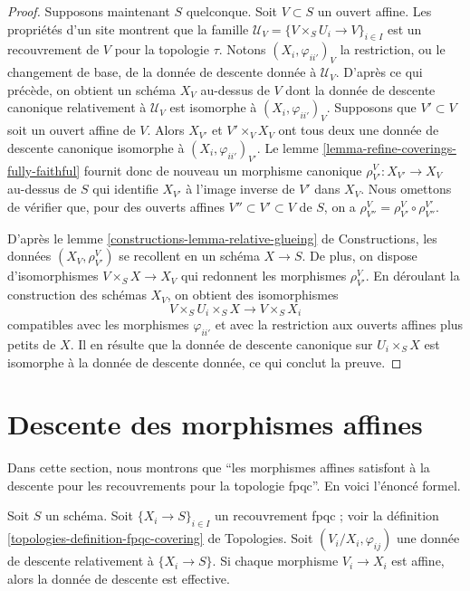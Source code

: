 \begin{proof}
\medskip\noindent
Supposons maintenant $S$ quelconque. Soit $V \subset S$ un ouvert affine.
Les propriétés d'un site montrent que la famille
$\mathcal{U}_V = \{V \times_S U_i \to V\}_{i \in I}$ est un recouvrement de
$V$ pour la topologie $\tau$. Notons $(X_i, \varphi_{ii'})_V$ la restriction, ou le
changement de base, de la donnée de descente donnée à $\mathcal{U}_V$. D'après
ce qui précède, on obtient un schéma $X_V$ au-dessus de $V$ dont la donnée de
descente canonique relativement à $\mathcal{U}_V$ est isomorphe à
$(X_i, \varphi_{ii'})_V$. Supposons que $V' \subset V$ soit un ouvert affine
de $V$. Alors $X_{V'}$ et $V' \times_V X_V$ ont tous deux une donnée de
descente canonique isomorphe à $(X_i, \varphi_{ii'})_{V'}$. Le
lemme \ref{lemma-refine-coverings-fully-faithful} fournit donc de nouveau un
morphisme canonique $\rho^V_{V'} : X_{V'} \to X_V$ au-dessus de $S$ qui
identifie $X_{V'}$ à l'image inverse de $V'$ dans $X_V$. Nous omettons de
vérifier que, pour des ouverts affines $V'' \subset V' \subset V$ de $S$, on a
$\rho^V_{V''} = \rho^V_{V'} \circ \rho^{V'}_{V''}$.

\medskip\noindent
D'après le lemme \ref{constructions-lemma-relative-glueing} de Constructions, les
données $(X_V, \rho^V_{V'})$ se recollent en un schéma $X \to S$. De plus, on
dispose d'isomorphismes $V \times_S X \to X_V$ qui redonnent les morphismes
$\rho^V_{V'}$. En déroulant la construction des schémas $X_V$, on obtient des
isomorphismes
$$
V \times_S U_i \times_S X
\longrightarrow
V \times_S X_i
$$
compatibles avec les morphismes $\varphi_{ii'}$ et avec la restriction aux
ouverts affines plus petits de $X$. Il en résulte que la donnée de descente
canonique sur $U_i \times_S X$ est isomorphe à la donnée de descente donnée,
ce qui conclut la preuve.
\end{proof}










\section{Descente des morphismes affines}
\label{section-affine}

\noindent
Dans cette section, nous montrons que
``les morphismes affines satisfont à la descente pour les recouvrements
pour la topologie fpqc''. En voici l'énoncé formel.

\begin{lemma}
\label{lemma-affine}
Soit $S$ un schéma. Soit $\{X_i \to S\}_{i\in I}$ un recouvrement fpqc ; voir
la définition \ref{topologies-definition-fpqc-covering} de Topologies. Soit
$(V_i/X_i, \varphi_{ij})$ une donnée de descente relativement à
$\{X_i \to S\}$. Si chaque morphisme $V_i \to X_i$ est affine, alors la
donnée de descente est effective.
\end{lemma}

